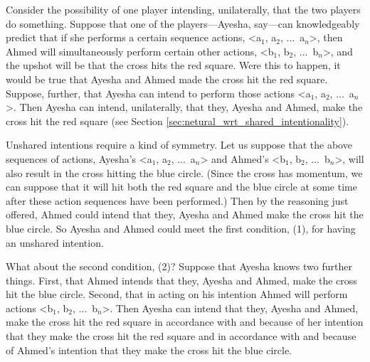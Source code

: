 \documentclass[12pt,\papersize]{extarticle}
\begin{document}
Consider the possibility of one player intending, unilaterally, that the two players do something.
Suppose that one of the players---Ayesha, say---can knowledgeably predict that if she performs a certain sequence actions, <a$_1$, a$_2$, ...\ a$_n$>, then Ahmed will simultaneously perform certain other actions, <b$_1$, b$_2$, ...\ b$_n$>,
 and the upshot will be that the cross hits the red square.
Were this to happen, it would be true that Ayesha and Ahmed made the cross hit the red square.
Suppose, further, that Ayesha can intend to perform those actions <a$_1$, a$_2$, ...\ a$_n$>.
Then Ayesha can intend, unilaterally, that they, Ayesha and Ahmed, make the cross hit the red square (see Section \vref{sec:netural_wrt_shared_intentionality}).

Unshared intentions require a kind of symmetry.
Let us suppose that the above sequences of actions,
	Ayesha's <a$_1$, a$_2$, ...\ a$_n$>  and 
	Ahmed's <b$_1$, b$_2$, ...\ b$_n$>,
will also result in the cross hitting the blue circle. 
(Since the cross has momentum, we can suppose that it will hit both the red square and the blue circle at some time after these action sequences have been performed.)
Then by the reasoning just offered, Ahmed could intend that they, Ayesha and Ahmed make the cross hit the blue circle.
So Ayesha and Ahmed could meet the first condition, (1), for having an unshared intention.

What about the second condition, (2)?
Suppose that Ayesha knows two further things.
First, that Ahmed intends that they, Ayesha and Ahmed, make the cross hit the blue circle.
Second, that in acting on his intention Ahmed will perform actions <b$_1$, b$_2$, ...\ b$_n$>.
Then Ayesha can intend that they, Ayesha and Ahmed, make the cross hit the red square in accordance with and because of her intention that they make the cross hit the red square and in accordance with and because of Ahmed's intention that they make the cross hit the blue circle.
\end{document}
